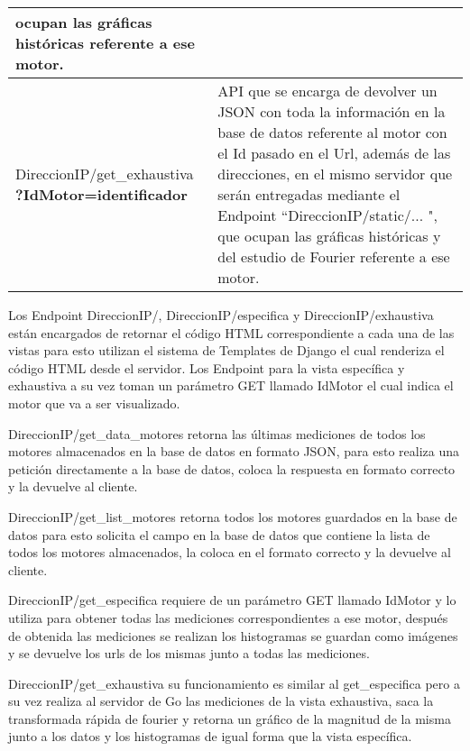 \begin{table}[ht]
\begin{center}
\begin{tabular}{|p{5cm}|p{10cm}|}
                ocupan las gráficas históricas referente a ese motor.
                \\\hline
                DireccionIP/get\_exhaustiva \textbf{?IdMotor=identificador}&
                API que se encarga de devolver un JSON con toda la información
                en la base de datos referente al motor con el Id pasado en el
                Url, además de las direcciones, en el mismo servidor que serán
                entregadas mediante el Endpoint ``DireccionIP/static/... ", que
                ocupan las gráficas históricas y del estudio de Fourier
                referente a ese motor.
                \\\hline
            \end{tabular}

        \end{center}

    \end{table}

    Los Endpoint DireccionIP/, DireccionIP/especifica y DireccionIP/exhaustiva
    están encargados de retornar el código HTML correspondiente a cada una de
    las vistas  para esto utilizan el sistema de Templates de Django el cual
    renderiza el código HTML desde el servidor. Los Endpoint para la vista
    específica y exhaustiva a su vez toman un parámetro GET llamado IdMotor el
    cual indica el motor que va a ser visualizado.

    DireccionIP/get_data_motores retorna las últimas mediciones de todos los
    motores almacenados en la base de datos en formato JSON, para esto realiza
    una petición directamente a la base de datos, coloca la respuesta en
    formato correcto y la devuelve al cliente.

    DireccionIP/get_list_motores retorna todos los motores guardados en la base
    de datos para esto solicita el campo en la base de datos que contiene la
    lista de todos los motores almacenados, la coloca en el formato correcto y
    la devuelve al cliente.

    DireccionIP/get_especifica requiere de un parámetro GET llamado IdMotor y
    lo utiliza para obtener todas las mediciones correspondientes a ese motor,
    después de obtenida las mediciones se realizan los histogramas se guardan
    como imágenes y se devuelve los urls de los mismas junto a todas las
    mediciones.

    DireccionIP/get_exhaustiva su funcionamiento es similar al get_especifica
    pero a su vez realiza al servidor de Go las mediciones de la vista
    exhaustiva, saca la transformada rápida de fourier y retorna un gráfico de
    la magnitud de la misma junto a los datos y los histogramas de igual forma
    que la vista específica.


